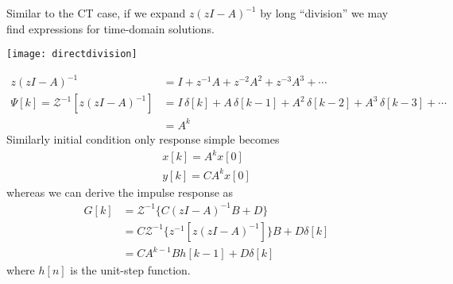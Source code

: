 \documentclass[twoside]{article}
\begin{document}
Similar to the CT case, if we expand $z \left( z I - A \right)^{-1}$ by long ``division'' we
may find expressions for time-domain solutions. 
%
     \begin{center}
 \begin{minipage}[h]{0.5\linewidth}
     \begin{center}
       \texttt{[image: directdivision]}
     \end{center}
 \end{minipage}
     \end{center}
%
\begin{align*}
z \left( z I - A \right)^{-1} &= I + z^{-1} A + z^{-2} A^2 + z^{-3} A^3
  + \cdots
\\
\Psi[k] = \mathcal{Z}^{-1} \left[ z \left( z I - A \right)^{-1} \right] &=
I \, \delta[k] + A \, \delta[k-1] + A^2 \, \delta[k-2] + A^3 \,
  \delta[k-3] + \cdots 
\\
&= A^k 
\end{align*}
%
Similarly initial condition only response simple becomes 
%
\begin{align*}
x[k] = A^k x[0]
\\
y[k] = C A^k x[0]
\end{align*}
%
whereas we can derive the impulse response as
%
\begin{align*}
G[k] &= \mathcal{Z}^{-1} \lbrace C \left( z I - A \right)^{-1} B + D \rbrace
\\
&= C \mathcal{Z}^{-1} \lbrace z^{-1}  \left[ z \left( z I - A
  \right)^{-1} \right]
  \rbrace B + D \delta[k]
\\
&= C A^{k-1} B h[k-1] + D \delta[k]  
\end{align*}
%
where $h[n]$ is the unit-step function. 

\end{document}
